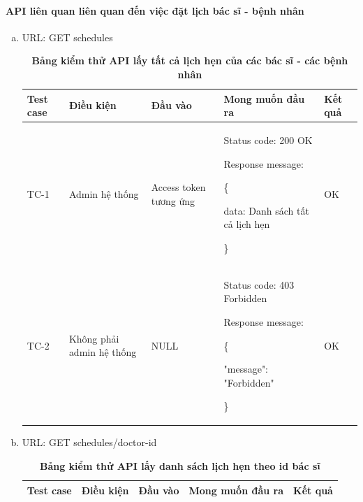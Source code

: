 \paragraph{API liên quan liên quan đến việc đặt lịch bác sĩ - bệnh nhân}
\mbox{}

\begin{enumerate}[a)]
  \item URL: GET schedules
    \begin{xltabular}{\textwidth}{
    | >{\raggedright\arraybackslash}p{1cm}
    | >{\raggedright\arraybackslash}p{2.5cm}
    | >{\raggedright\arraybackslash}p{2.5cm}
    | >{\raggedright\arraybackslash}X
    | >{\raggedright\arraybackslash}p{1cm}|
    }
    \caption{\bfseries \fontsize{12pt}{0pt}\selectfont Bảng kiểm thử API lấy tất cả lịch hẹn của các bác sĩ - các bệnh nhân}
    \\
    \hline
    \bfseries Test case    &\bfseries Điều kiện   &\bfseries Đầu vào 
    &\bfseries Mong muốn đầu ra &\bfseries Kết quả\\ \hline
  
  
    TC-1
    & Admin hệ thống
    & Access token tương ứng
    & 
  
    Status code: 200 OK
  
      Response message:
  
      \{

    data: Danh sách tất cả lịch hẹn
  
    \}
    & OK
  
    \\ \hline
  
    TC-2
    & Không phải admin hệ thống
    & NULL
  
    & 
  
    Status code: 403 Forbidden
  
    Response message:

    \{

  "message": "Forbidden"

  \}
    & OK
    \\ \hline
    \end{xltabular}

  \item URL: GET schedules/doctor-id
    \begin{xltabular}{\textwidth}{
    | >{\raggedright\arraybackslash}p{1cm}
    | >{\raggedright\arraybackslash}p{2.5cm}
    | >{\raggedright\arraybackslash}X
    | >{\raggedright\arraybackslash}X
    | >{\raggedright\arraybackslash}p{1cm}|
    }
    \caption{\bfseries \fontsize{12pt}{0pt}\selectfont Bảng kiểm thử API lấy danh sách lịch hẹn theo id bác sĩ}
    \\
    \hline
    \bfseries Test case    &\bfseries Điều kiện   &\bfseries Đầu vào 
    &\bfseries Mong muốn đầu ra &\bfseries Kết quả\\ \hline
  

\end{xltabular}
\end{enumerate}
